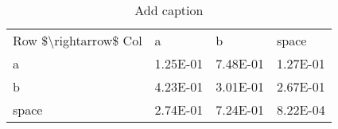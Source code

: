 \begin{table}[htbp]
  \centering
  \caption{Add caption}
    \begin{tabular}{lrrr}
    Row \$\textbackslash{}rightarrow\$ Col & \multicolumn{1}{l}{a} & \multicolumn{1}{l}{b} & \multicolumn{1}{l}{space} \\
    a     & 1.25E-01 & 7.48E-01 & 1.27E-01 \\
    b     & 4.23E-01 & 3.01E-01 & 2.67E-01 \\
    space & 2.74E-01 & 7.24E-01 & 8.22E-04 \\
    \end{tabular}%
  \label{tab:addlabel}%
\end{table}%

